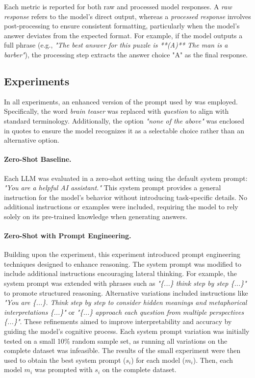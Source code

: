 Each metric is reported for both raw and processed model responses. A \textit{raw response} refers to the model's direct output, whereas a \textit{processed response} involves post-processing to ensure consistent formatting, particularly when the model's answer deviates from the expected format. For example, if the model outputs a full phrase (e.g., \textit{"The best answer for this puzzle is **(A)** The man is a barber"}), the processing step extracts the answer choice "A" as the final response.

\subsection{Experiments}

In all experiments, an enhanced version of the prompt used by \textcite{jiangBRAINTEASERLateralThinking2023} was employed. Specifically, the word \textit{brain teaser} was replaced with \textit{question} to align with standard terminology. Additionally, the option \textit{"none of the above"} was enclosed in quotes to ensure the model recognizes it as a selectable choice rather than an alternative option.

\paragraph{Zero-Shot Baseline.}
\label{zero-shot-prompt}
Each \ac{LLM} was evaluated in a zero-shot setting using the default system prompt: \textit{"You are a helpful AI assistant."} This system prompt provides a general instruction for the model's behavior without introducing task-specific details. No additional instructions or examples were included, requiring the model to rely solely on its pre-trained knowledge when generating answers.

\paragraph{Zero-Shot with Prompt Engineering.}
\label{zero-shot-prompt-engineering}
Building upon the  experiment, this experiment introduced prompt engineering techniques designed to enhance reasoning. The system prompt was modified to include additional instructions encouraging lateral thinking. For example, the system prompt was extended with phrases such as \textit{"\{...\} think step by step \{...\}"} to promote structured reasoning. Alternative variations included instructions like \textit{"You are \{...\}. Think step by step to consider hidden meanings and metaphorical interpretations \{...\}"} or \textit{"\{...\} approach each question from multiple perspectives \{...\}"}. These refinements aimed to improve interpretability and accuracy by guiding the model's cognitive process. Each system prompt variation was initially tested on a small 10\% random sample set, as running all variations on the complete dataset was infeasible. The results of the small experiment were then used to obtain the best system prompt ($s_i$) for each model ($m_i$). Then, each model $m_i$ was prompted with $s_i$ on the complete dataset.

